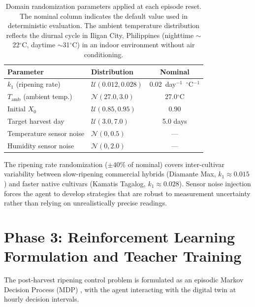     \begin{table}[ht]
        \caption{Domain randomization parameters applied at each episode reset. The nominal column indicates the default value used in deterministic evaluation. The ambient temperature distribution reflects the diurnal cycle in Iligan City, Philippines (nighttime $\sim$22$^{\circ}$C, daytime $\sim$31$^{\circ}$C) in an indoor environment without air conditioning.}
        \label{tab:domain_rand}
        \centering
        \begin{tabular}{llc}
            \hline
            \textbf{Parameter} & \textbf{Distribution} & \textbf{Nominal} \\
            \hline
            $k_1$ (ripening rate) & $\mathcal{U}(0.012, 0.028)$ & 0.02~day$^{-1}$~$^{\circ}$C$^{-1}$ \\
            $T_{\text{amb}}$ (ambient temp.) & $\mathcal{N}(27.0, 3.0)$ & 27.0$^{\circ}$C \\
            Initial $X_0$ & $\mathcal{U}(0.85, 0.95)$ & 0.90 \\
            Target harvest day & $\mathcal{U}(3.0, 7.0)$ & 5.0 days \\
            Temperature sensor noise & $\mathcal{N}(0, 0.5)$ & --- \\
            Humidity sensor noise & $\mathcal{N}(0, 2.0)$ & --- \\
            \hline
        \end{tabular}
    \end{table}

    The ripening rate randomization ($\pm 40\%$ of nominal) covers inter-cultivar variability between slow-ripening commercial hybrids (Diamante Max, $k_1 \approx 0.015$) and faster native cultivars (Kamatis Tagalog, $k_1 \approx 0.028$). Sensor noise injection forces the agent to develop strategies that are robust to measurement uncertainty rather than relying on unrealistically precise readings.



\section{Phase 3: Reinforcement Learning Formulation and Teacher Training}
    \label{sec:RL Formulation}

    The post-harvest ripening control problem is formulated as an episodic Markov Decision Process (MDP) \citep{bellman1957}, with the agent interacting with the digital twin at hourly decision intervals.

